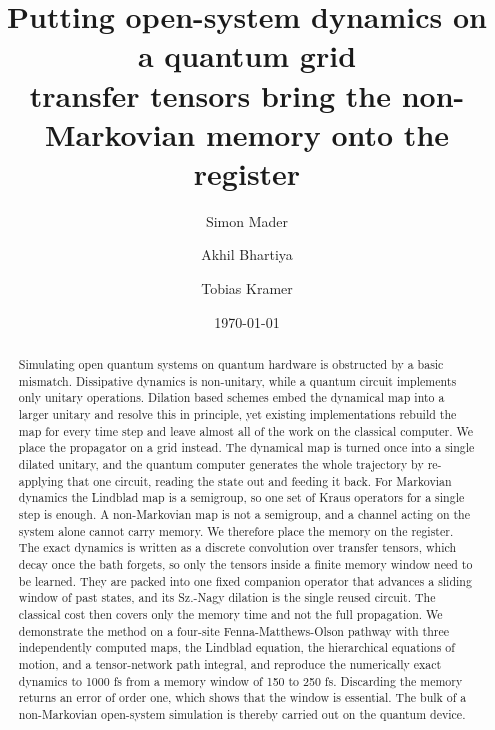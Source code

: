 \documentclass[aps,pra,twocolumn,superscriptaddress,nofootinbib,longbibliography]{revtex4-2}
\begin{document}
\title{Putting open-system dynamics on a quantum grid\\
transfer tensors bring the non-Markovian memory onto the register}

\author{Simon Mader}
\author{Akhil Bhartiya}
\author{Tobias Kramer}

\date{\today}

\begin{abstract}
Simulating open quantum systems on quantum hardware is obstructed by a basic
mismatch. Dissipative dynamics is non-unitary, while a quantum circuit
implements only unitary operations. Dilation based schemes embed the dynamical
map into a larger unitary and resolve this in principle, yet existing
implementations rebuild the map for every time step and leave almost all of the
work on the classical computer. We place the propagator on a grid instead. The
dynamical map is turned once into a single dilated unitary, and the quantum
computer generates the whole trajectory by re-applying that one circuit, reading
the state out and feeding it back. For Markovian dynamics the Lindblad map is a
semigroup, so one set of Kraus operators for a single step is enough. A
non-Markovian map is not a semigroup, and a channel acting on the system alone
cannot carry memory. We therefore place the memory on the register. The exact
dynamics is written as a discrete convolution over transfer tensors, which decay
once the bath forgets, so only the tensors inside a finite memory window need to
be learned. They are packed into one fixed companion operator that advances a
sliding window of past states, and its Sz.-Nagy dilation is the single reused
circuit. The classical cost then covers only the memory time and not the full
propagation. We demonstrate the method on a four-site Fenna-Matthews-Olson
pathway with three independently computed maps, the Lindblad equation, the
hierarchical equations of motion, and a tensor-network path integral, and
reproduce the numerically exact dynamics to 1000 fs from a memory window of 150
to 250 fs. Discarding the memory returns an error of order one, which shows that
the window is essential. The bulk of a non-Markovian open-system simulation is
thereby carried out on the quantum device.
\end{abstract}
\end{document}
